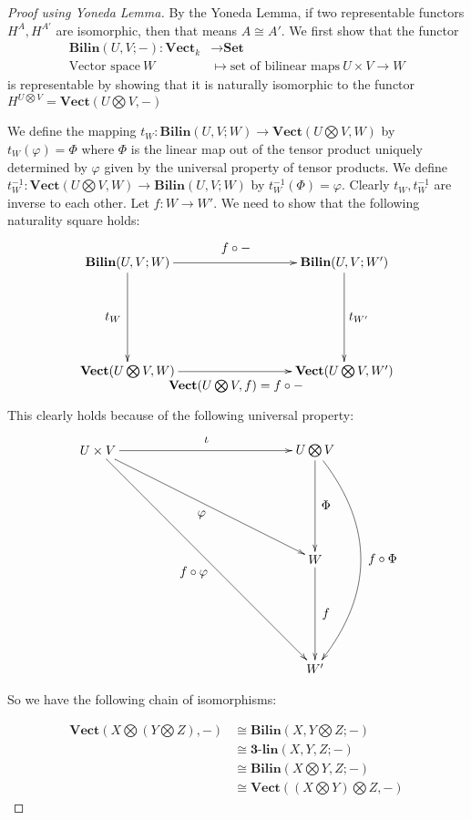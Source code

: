 \documentclass[11pt]{article}
\theoremstyle{definition}
\theoremstyle{plain}
\theoremstyle{plain}
\theoremstyle{plain}
\theoremstyle{definition}
\begin{document}
\begin{proof}[Proof using Yoneda Lemma]
By the Yoneda Lemma, if two representable functors $H^A, H^{A'}$ are isomorphic, then that means $A \cong A'$. We first show that the functor
\begin{align*}
\textbf{Bilin}(U, V; -): \textbf{Vect}_k &\to \textbf{Set} \\
\text{Vector space} \  W &\mapsto \text{set of bilinear maps} \  U \times V \to W
\end{align*}
is representable by showing that it is naturally isomorphic to the functor $H^{U \bigotimes V} = \textbf{Vect}(U \bigotimes V, -)$

We define the mapping $t_W: \textbf{Bilin}(U,V; W) \to \textbf{Vect}(U \bigotimes V, W)$ by $t_W(\varphi) = \Phi$ where $\Phi$ is the linear map out of the tensor product uniquely determined by $\varphi$ given by the universal property of tensor products. We define $t_W^{-1}: \textbf{Vect}(U \bigotimes V, W) \to \textbf{Bilin}(U,V; W)$  by $t_W^{-1}(\Phi) = \varphi$. Clearly $t_W, t_W^{-1}$ are inverse to each other. Let $f: W \to W'$. We need to show that the following naturality square holds:

\begin{equation*}
\begin{xy}
(0,0)*+{\textbf{Bilin}(U,V;W)}="v1"; (60,0)*+{\textbf{Bilin}(U,V;W')}="v2"; (0,-30)*+{\textbf{Vect}(U \bigotimes V, W)}="v3"; (60,-30)*+{\textbf{Vect}(U \bigotimes V, W')}="v4";
{\ar "v1";"v2"}?*!/_4mm/{f \circ -};
{\ar "v1";"v3"}?*!/^4mm/{t_W};
{\ar "v2";"v4"}?*!/_4mm/{t_{W'}};
{\ar "v3";"v4"}?*!/^4mm/{\textbf{Vect}(U \bigotimes V, f) = f \circ -};
\end{xy}
\end{equation*}

This clearly holds because of the following universal property:

\begin{equation*}
\begin{xy}
(0,0)*+{U \times V}="v1"; (60,0)*+{U \bigotimes V}="v2"; (60, -30)*+{W}="v3"; (60, -60)*+{W'}="v4";
{\ar "v1";"v2"}?*!/_3mm/{\iota};
{\ar "v2";"v3"}?*!/_3mm/{\Phi};
{\ar "v1";"v3"}?*!/^3mm/{\varphi};
{\ar "v3";"v4"}?*!/_3mm/{f};
{\ar "v1";"v4"}?*!/^5mm/{f \circ \varphi};
{\ar@/^3pc/ "v2";"v4"}?*!/_6mm/{f \circ \Phi};
\end{xy}
\end{equation*}

So we have the following chain of isomorphisms:

\begin{align*}
\textbf{Vect}(X \bigotimes (Y \bigotimes Z), -) &\cong \textbf{Bilin}(X, Y \bigotimes Z; -) \\
&\cong \textbf{3-lin}(X, Y, Z; -) \\
&\cong \textbf{Bilin}(X \bigotimes Y, Z; -) \\
&\cong \textbf{Vect}((X \bigotimes Y) \bigotimes Z, -)
\end{align*}
\end{proof}

\nocite{*}


\end{document}
